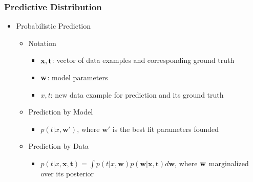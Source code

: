\subsubsection{Predictive Distribution}
\begin{itemize}
\item Probabilistic Prediction
	\begin{itemize}
	\item Notation
		\begin{itemize}
		\item $\bf x, \bf t$: vector of data examples and corresponding ground truth
		\item $\bf w$: model parameters
		\item $x, t$: new data example for prediction and its ground truth
		\end{itemize}
	\item Prediction by Model
		\begin{itemize}
		\item $p(t|x, \mathbf{w}')$, where $\mathbf w'$ is the best fit parameters founded
		\end{itemize}
	\item Prediction by Data
		\begin{itemize}
		\item $\displaystyle p(t|x,\mathbf{x},\mathbf{t}) = \int p(t|x,\mathbf{w})p(\mathbf{w}|\mathbf{x},\mathbf{t}) d\mathbf w$, where $\bf w$ marginalized over its posterior 
		\end{itemize}
	\end{itemize}
\end{itemize}